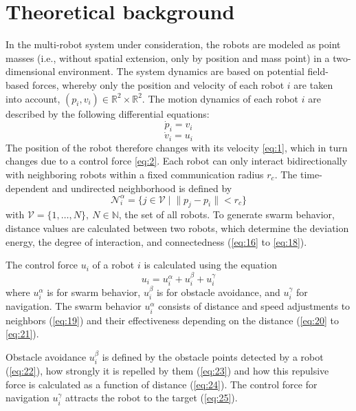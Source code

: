 \documentclass[conference]{IEEEtran}
\begin{document}
\section{Theoretical background}
In the multi-robot system under consideration, the robots are modeled as point masses 
(i.e., without spatial extension, only by position and mass point) in a 
two-dimensional environment. The system dynamics are based on potential field-based 
forces, whereby only the position and velocity of each robot $i$ are taken into account,
$(p_i, v_i) \in \mathbb{R}^2 \times \mathbb{R}^2$.
The motion dynamics of each robot $i$ are described by the following differential equations:
\begin{equation}
    \dot{p}_i = v_i
    \label{eq:1}
\end{equation}
\begin{equation}
    \dot{v}_i = u_i
    \label{eq:2}
\end{equation}
The position of the robot therefore changes with its velocity \eqref{eq:1}, which in turn changes 
due to a control force \eqref{eq:2}.
Each robot can only interact bidirectionally with neighboring robots within a fixed 
communication radius $r_c$. The time-dependent and undirected 
neighborhood is defined by
\begin{equation}
    \mathcal{N}_i^\alpha = \{ j \in \mathcal{V} \; | \; \| p_j - p_i \| < r_c \}
    \label{eq:3}
\end{equation}
with $\mathcal{V} = \{1, \ldots, N\},\ N \in \mathbb{N}$, the set of all robots.
To generate swarm behavior, distance values are calculated between two robots, 
which determine the deviation energy, the degree of interaction, and connectedness 
(\eqref{eq:16} to \eqref{eq:18}).

The control force $u_i$ of a robot $i$ is calculated using the equation
\begin{equation}
    u_i = u_i^\alpha + u_i^\beta + u_i^\gamma
    \label{eq:4}
\end{equation}
where $u_i^\alpha$ is for swarm behavior, $u_i^\beta$ is for 
obstacle avoidance, and $u_i^\gamma$ for navigation. The swarm behavior 
$u_i^\alpha$ consists of distance and speed adjustments to neighbors 
(\eqref{eq:19}) 
and their effectiveness depending on the distance 
(\eqref{eq:20} to \eqref{eq:21}).

Obstacle avoidance $u_i^\beta$ is defined by the obstacle points 
detected by a robot (\eqref{eq:22}), how strongly it is repelled by them 
(\eqref{eq:23}) and how this repulsive force is calculated as a function of distance 
(\eqref{eq:24}). The control force for navigation $u_i^\gamma$ 
attracts the robot to the target (\eqref{eq:25}).
\end{document}
